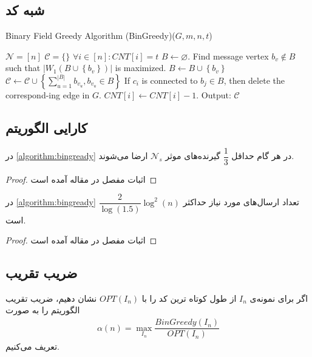 \subsection{شبه کد}
	\begin{algorithm}[H]
	\caption{Binary Field Greedy Algorithm (BinGreedy)($G,m,n,t$) \cite{pliable2016}}
	\label{algorithm:bingready}
	\begin{algorithmic}[1]
		\State $\mathcal{N} = [n]$
		\State $\mathcal{C} = \{\}$
		\State $\forall i \in [n]: CNT[i] = t$ 
		\State $B \leftarrow \varnothing$.
		\State Find message vertex $b_v \notin B$ such that $\left|W_1\left(B \cup\left\{b_v\right\}\right)\right|$ is maximized.
		\State $B \leftarrow B \cup\left\{b_v\right\}$
		\EndWhile
		\State $\mathcal{C} \leftarrow \mathcal{C} \cup\left\{\sum_{u=1}^{|B|} b_{v_u}, b_{v_u} \in B\right\}$
		\State If $c_i$ is connected to $b_j \in B$, then delete the correspond-ing edge in $G$.
		\State $CNT[i] \leftarrow CNT[i]-1$.
		\EndFor
		\EndWhile
		\State Output: $\mathcal{C}$
	\end{algorithmic}
\end{algorithm}


\subsection{
کارایی الگوریتم
}
\begin{lemma}
	\label{lemma:pliable2016:lemma2}
	در 
	\autoref{algorithm:bingready}
	در هر گام حداقل 
	$\dfrac{1}{3}$
	گیرنده‌های موثر
	$\mathcal{N}_s$
	ارضا می‌شوند.
\end{lemma}
\begin{proof}
	اثبات مفصل در مقاله آمده است
\end{proof}

\begin{theorem}
	\label{theorem:pliable2016:theorem1}
	در 
		\autoref{algorithm:bingready}
		تعداد ارسال‌های مورد نیاز حداکثر
		$\dfrac{2}{\log(1.5)} \log^2(n)$
		است.
\end{theorem}
\begin{proof}
	اثبات مفصل در مقاله آمده است
\end{proof}
\subsection{
ضریب تقریب
}
اگر برای نمونه‌ی
$I_n$
از 
\picod
طول کوتاه ترین کد را با
$OPT(I_n)$
نشان دهیم، ضریب تقریب الگوریتم را به صورت
 \begin{align}
 	\alpha(n) = \max\limits_{I_n} \dfrac{BinGreedy(I_n)}{OPT(I_n)}
 \end{align}
تعریف می‌کنیم.


